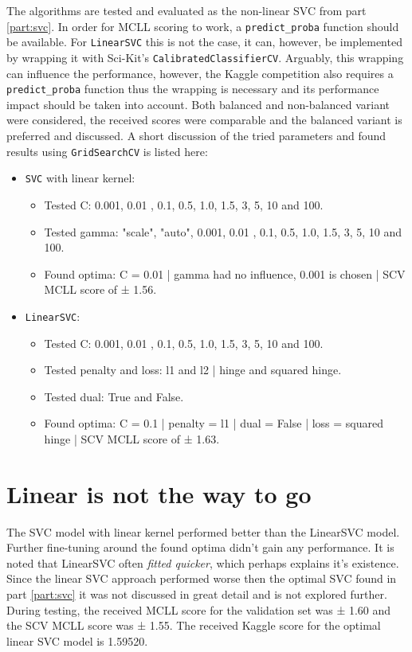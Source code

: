 The algorithms are tested and evaluated as the non-linear SVC from part \ref{part:svc}.
In order for MCLL scoring to work, a \texttt{predict\_proba} function should be available.
For \texttt{LinearSVC} this is not the case, it can, however, be implemented by wrapping it with Sci-Kit's \texttt{CalibratedClassifierCV}.
Arguably, this wrapping can influence the performance, however, the Kaggle competition also requires a \texttt{predict\_proba} function thus the wrapping is necessary and its performance impact should be taken into account.
Both balanced and non-balanced variant were considered, the received scores were comparable and the balanced variant is preferred and discussed.
A short discussion of the tried parameters and found results using \texttt{GridSearchCV} is listed here:
\begin{itemize}
    \item \texttt{SVC} with linear kernel:
    \begin{itemize}
        \item Tested C: 0.001, 0.01 , 0.1, 0.5, 1.0, 1.5, 3, 5, 10 and 100.
        \item Tested gamma: "scale", "auto", 0.001, 0.01 , 0.1, 0.5, 1.0, 1.5, 3, 5, 10 and 100.
        \item Found optima: C = 0.01 | gamma had no influence, 0.001 is chosen | SCV MCLL score of ± 1.56.
    \end{itemize}
    \item \texttt{LinearSVC}:
    \begin{itemize}
        \item Tested C: 0.001, 0.01 , 0.1, 0.5, 1.0, 1.5, 3, 5, 10 and 100.
        \item Tested penalty and loss: l1 and l2 | hinge and squared hinge.
        \item Tested dual: True and False.
        \item Found optima: C = 0.1 | penalty = l1 | dual = False | loss = squared hinge | SCV MCLL score of ± 1.63.
    \end{itemize}
\end{itemize}


\section{Linear is not the way to go}
\label{section:linsvc_optimal}

The SVC model with linear kernel performed better than the LinearSVC model.
Further fine-tuning around the found optima didn't gain any performance.
It is noted that LinearSVC often \textit{fitted quicker}, which perhaps explains it's existence.
Since the linear SVC approach performed worse then the optimal SVC found in part \ref{part:svc} it was not discussed in great detail and is not explored further.
During testing, the received MCLL score for the validation set was ± 1.60 and the SCV MCLL score was ± 1.55.
The received Kaggle score for the optimal linear SVC model is 1.59520.